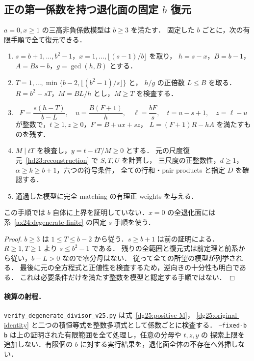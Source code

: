 \subsection{正の第一係数を持つ退化面の固定 \texorpdfstring{$b$}{b} 復元}

\begin{corollary}[固定 $b$ に対する完全有限手順]
\label{dg25:fixed-b}
$a=0,x\ge1$ の三高非負係数模型は $b\ge3$ を満たす．
固定した $b$ ごとに，次の有限手順で全て復元できる．
\begin{enumerate}
 \item $s=b+1,\ldots,b^2-1$，$x=1,\ldots,\lfloor(s-1)/b\rfloor$ を取り，
 $h=s-x$，$B=b-1$，$A=Bs-b$，$g=\gcd(h,B)$ とする．
 \item $T=1,\ldots,\min\{b-2,\lfloor(b^2-1)/s\rfloor\}$ と，
 $h/g$ の正倍数 $L\le B$ を取る．$R=b^2-sT$，$M=BL/h$ とし，$M\ge T$ を検査する．
 \item
 \[
 F=\frac{s(h-T)}{b-L},\quad u=\frac{B(F+1)}h,\quad
 \ell=\frac{bF}s,\quad t=u-s+1,\quad z=\ell-u
 \]
 が整数で，$t\ge1,z\ge0$，$F=B+ux+sz$，
 $L=(F+1)R-hA$ を満たすものを残す．
 \item $M\mid tT$ を検査し，$y=t-tT/M\ge0$ とする．
 元の尺度復元~\eqref{hd23:reconstruction} で $S,T,U$ を計算し，
 三尺度の正整数性，$d\ge1$，$\alpha\ge k\ge b+1$，六つの符号条件，
 全ての行和・pair products と指定 $D$ を確認する．
 \item 通過した模型に完全 matching の有理正 weights を与える．
\end{enumerate}
この手順では $b$ 自体に上界を証明していない．$x=0$ の全退化面には
系~\ref{ax24:degenerate-finite} の固定 $s$ 手順を使う．
\end{corollary}

\begin{proof}
$b\ge3$ は $1\le T\le b-2$ から従う．$s\ge b+1$ は前の証明による．
$R\ge1,T\ge1$ より $s\le b^2-1$ である．
残りの全範囲と復元式は前定理と前系から従い，$b-L>0$ なので零分母はない．
従って全ての所望の模型が列挙される．
最後に元の全方程式と正値性を検査するため，逆向きの十分性も明白である．
これは必要条件だけを満たす整数を模型と認定する手順ではない．
\end{proof}

\paragraph{検算の射程．}
\nolinkurl{verify_degenerate_divisor_v25.py} は式~\eqref{dg25:positive-M}，
\eqref{dg25:original-identity} と二つの積恒等式を整数多項式として係数ごとに検査する．
\texttt{--fixed-b b} は上の証明された有限範囲を全て処理し，任意の分母や $t,z,y$ の
探索上限を追加しない．有限個の $b$ に対する実行結果を，退化面全体の不存在へ外挿しない．
